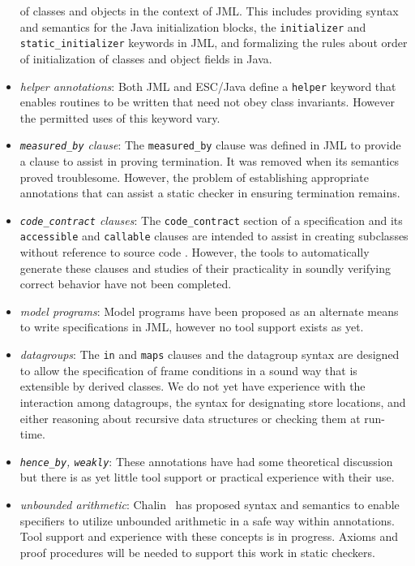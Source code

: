 \documentclass{sig-alternate}
\begin{document}
\begin{itemize}
of classes and objects in the context of JML.  This includes providing syntax and semantics for the
Java initialization blocks, the \texttt{initializer} and \texttt{static\_initializer} keywords in
JML, and formalizing the rules about order of initialization of classes and object fields in Java.
\item \textit{helper annotations}:  Both JML and ESC/Java define a \texttt{helper} keyword that enables 
routines to be written that need not obey class invariants.  However the permitted uses of this
keyword vary.
\item \textit{\texttt{measured\_by} clause}:  The \texttt{measured\_by} clause was defined in JML to
provide a clause to assist in proving termination.  It was removed when its semantics
proved troublesome.  However, the problem of establishing appropriate annotations that
can assist a static checker in ensuring termination remains.
\item \textit{\texttt{code\_contract} clauses}:  The \texttt{code\_contract} section of a specification and its
\texttt{accessible} and \texttt{callable} clauses are intended to assist in creating subclasses 
without reference to source code \cite{Ruby-Leavens00}.  However, the tools to automatically
generate these clauses and studies of their practicality in soundly verifying correct behavior have
not been completed.
\item \textit{model programs}:  Model programs have been proposed as an alternate means to write
specifications in JML, however no tool support exists as yet.
\item \textit{datagroups}:  The \texttt{in} and \texttt{maps} clauses and the datagroup syntax are designed
to allow the specification of frame conditions in a sound way that is extensible by derived classes. 
We do not yet have experience with the interaction among datagroups, the syntax for designating store locations, and either reasoning about recursive data structures or checking them at 
run-time.
\item \textit{\texttt{hence\_by}, \texttt{weakly}}:  These annotations have had some theoretical discussion but
there is as yet little tool support or practical experience with their use.
\item \textit{unbounded
  arithmetic}:  Chalin~\cite{Chalin03} has proposed syntax and semantics to enable specifiers to utilize unbounded arithmetic in a safe way within annotations.  Tool support and experience with
these concepts is in progress.  Axioms and proof procedures will be needed to support this work
in static checkers.
\end{itemize}
\end{document}
